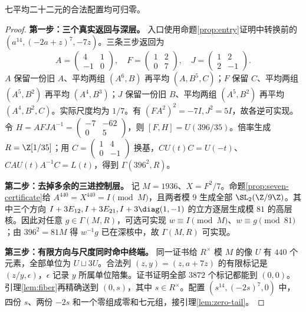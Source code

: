 \begin{lemma}[七平均二十二元的方向与尺度]\label{lem:seven22}
七平均二十二元的合法配置均可归零。
\end{lemma}
\begin{proof}

\par\noindent\textbf{第一步：三个真实返回与深层。}
入口使用命题\ref{prop:entry}证明中转换前的 $(a^{14},(-2a+z)^7,-7z)$。三条三步返回为
\[
A=\begin{pmatrix}4&1\\-1&0\end{pmatrix},\quad
F=\begin{pmatrix}1&2\\0&7\end{pmatrix},\quad
J=\begin{pmatrix}1&2\\2&-1\end{pmatrix}.
\]
$A$ 保留一份旧 $A$、平均两组 $(A^6,B)$ 再平均 $(A,B^5,C)$；$F$ 保留 $C$、平均两组 $(A^5,B^2)$ 再平均 $(A^4,B^3)$；$J$ 保留一份旧 $B$、平均两组 $(A^5,B^2)$ 再平均 $(A^4,B^2,C)$。实际尺度均为 $1/7$。有 $(FA^2)^2=-7I,J^2=5I$，故各逆可实现。
令 $H=AFJA^{-1}=\left(\begin{smallmatrix}-7&-62\\0&5\end{smallmatrix}\right)$，则 $[F,H]=U(396/35)$。倍率生成 $R=\Z[1/35]$；用 $C=\left(\begin{smallmatrix}1&4\\0&-1\end{smallmatrix}\right)$ 换基，$CU(t)C=U(-t)$、$CAU(t)A^{-1}C=L(t)$，得到 $\Gamma(396^2,R)$。

\par\noindent\textbf{第二步：去掉多余的三进控制层。}
记 $M=1936$、$X=F^2/7$。命题\ref{prop:seven-certificate}给 $A^{440}=X^{440}=I\pmod M$，且两者模 $9$ 生成全部 $\SL_2(\Z/9\Z)$。其中三个方向 $I+3E_{12},I+3E_{21},I+3\diag(1,-1)$ 的立方逐层生成模 $81$ 的高层核。因此对任意 $g\in\Gamma(M,R)$，可选可实现 $w\equiv I\pmod M$、$w\equiv g\pmod{81}$；由 $396^2=81M$ 得 $w^{-1}g$ 已在深核中，故 $\Gamma(M,R)$ 可实现。

\par\noindent\textbf{第三步：有限方向与尺度同时命中终端。}
同一证书给 $R^\times$ 模 $M$ 的像 $U$ 有 $440$ 个元素，全部单位为 $U\sqcup3U$。合法列 $(z,y)=(z,a+7z)$ 的有限标记是 $(z/y,\epsilon)$，$\epsilon$ 记录 $y$ 所属单位陪集。证书证明全部 $3872$ 个标记都能到 $(0,0)$。引理\ref{lem:fiber}再精确送到 $(0,s)$，其中 $s\in R^\times$。配置 $(s^{14},(-2s)^7,0)$ 中，四份 $s$、两份 $-2s$ 和一个零组成零和七元组，接引理\ref{lem:zero-tail}。
\end{proof}



